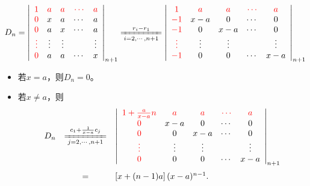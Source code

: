 \begin{frame}

 
  $$
  D_n = \left|
    \begin{array}{ccccc}
      \red{1}   & \red{a}  & \red{a}  & \red{\cd} & \red{a}   \\
      \red{0}   & x  & a  & \cd & a   \\
      \red{0}   & a  & x  & \cd & a   \\
      \red{\vd} &\vd &\vd &     & \vd \\
      \red{0}   & a  & a  & \cd & x 
    \end{array}
  \right|_{n+1} 
  \xlongequal[i=2,\cdots,n+1]{r_i-r_1} 
  \left|
    \begin{array}{ccccc}
      \red{1}    & \red{a}  & \red{a} & \red{\cd} & \red{a}   \\
      \red{-1}   & x-a      &  0      & \cd & 0   \\
      \red{-1}   & 0        &  x-a    & \cd & 0   \\
      \red{\vd}  &\vd       & \vd     &     & \vd \\
      \red{-1}   & 0        &   0     & \cd & x-a 
    \end{array}
  \right|_{n+1}
  $$
  \begin{itemize}
  \item
    若$x=a$，则$D_n=0$。 
  \item 
    若$x\ne a$，则
    $$
    \begin{array}{rcl}
      D_n &  \xlongequal[j=2,\cd,n+1]{c_1+ \frac1{x-a}c_j} & 
                                                             \left|
                                                             \begin{array}{ccccc}
                                                               \red{1+\frac{a}{x-a}n}   & \red{a}  & \red{a}  & \red{\cd} & \red{a}   \\
                                                               \red{0}   & x-a  & 0  & \cd & 0   \\
                                                               \red{0}   & 0  & x-a  & \cd & 0   \\
                                                               \red{\vd} &\vd &\vd &     & \vd \\
                                                               \red{0}   & 0  & 0  & \cd & x-a
                                                             \end{array}
                                                                                           \right|_{n+1} \\[0.5in]
          &  = &   \left[x+(n-1)a\right](x-a)^{n-1}.
    \end{array}
    $$
  \end{itemize}
\end{frame}

